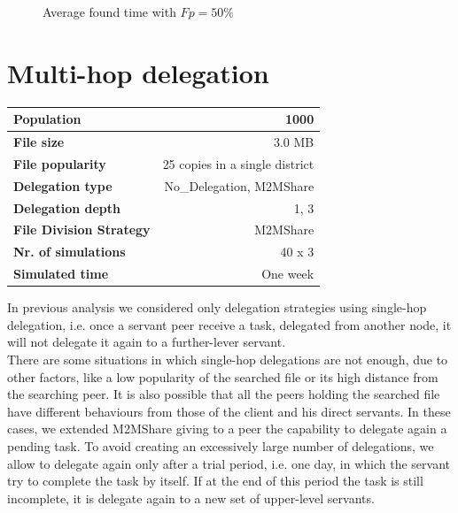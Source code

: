 \begin{figure}[ht]
\begin{center}
\begin{minipage}[b]{0.5\linewidth}
\caption{Average found time with $Fp = 50\%$}
\label{graficiTempiVF_Fp50}
\end{minipage}
\end{center}
\end{figure}

\newpage
\section{Multi-hop delegation}
\begin{table}[h]
\begin{center}
\begin{tabular}{|l|r|}
\hline
\bfseries Population & 1000 \\
\hline
\bfseries File size & 3.0 MB \\
\hline
\bfseries File popularity & 25 copies in a single district \\
\hline
\bfseries Delegation type & No\_Delegation, M2MShare\\
\hline
\bfseries Delegation depth & 1, 3 \\
\hline
\bfseries File Division Strategy & M2MShare \\
\hline
\bfseries Nr. of simulations & 40 x 3\\
\hline
\bfseries Simulated time & One week \\
\hline
\end{tabular}
\end{center}
\end{table}
In previous analysis we considered only delegation strategies using single-hop delegation, i.e. once a servant peer receive a task, delegated from another node, it will not delegate it again to a further-lever servant. 
\\

There are some situations in which single-hop delegations are not enough, due to other factors, like a low popularity of the searched file or its high distance from the searching peer. It is also possible that all the peers holding the searched file have different behaviours from those of the client and his direct servants. In these cases, we extended M2MShare giving to a peer the capability to delegate again a pending task. To avoid creating an excessively large number of delegations, we allow to delegate again only after a trial period, i.e. one day, in which the servant try to complete the task by itself. If at the end of this period the task is still incomplete, it is delegate again to a new set of upper-level servants.
\\

